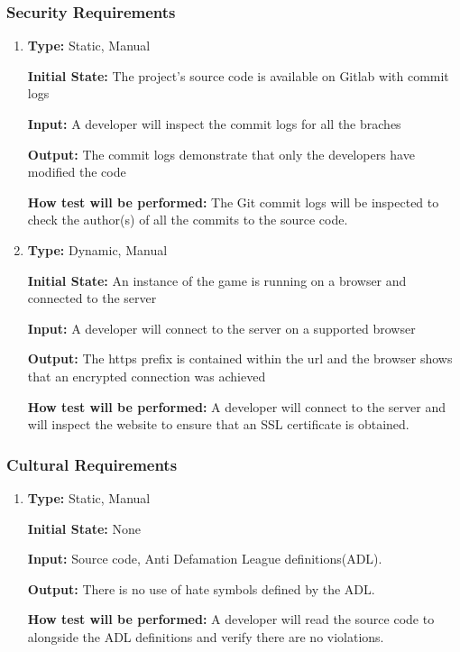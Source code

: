\documentclass[12pt, titlepage]{article}
\begin{document}
	\subsubsection{Security Requirements}
	\begin{enumerate}[{NFR-SR}1. ]
		
		\item
		\textbf{Type:} Static, Manual
		
		\textbf{Initial State:} The project's source code is available on Gitlab with commit logs
		
		\textbf{Input:} A developer will inspect the commit logs for all the braches
		
		\textbf{Output:} The commit logs demonstrate that only the developers have modified the code
		
		\textbf{How test will be performed:} The Git commit logs will be inspected to check the author(s) of all the commits to the source code.
		
		\item
		\textbf{Type:} Dynamic, Manual
		
		\textbf{Initial State:} An instance of the game is running on a browser and connected to the server
		
		\textbf{Input:} A developer will connect to the server on a supported browser
		
		\textbf{Output:} The https prefix is contained within the url and the browser shows that an encrypted connection was achieved
		
		\textbf{How test will be performed:} A developer will connect to the server and will inspect the website to ensure that an SSL certificate is obtained.
	\end{enumerate}
	\subsubsection{Cultural Requirements}
	\begin{enumerate}[{NFR-CR}1. ]
		\item
		\textbf{Type:} Static, Manual
		
		\textbf{Initial State:} None
		
		\textbf{Input:} Source code, Anti Defamation League definitions(ADL).
		
		\textbf{Output:} There is no use of hate symbols defined by the ADL.
		
		\textbf{How test will be performed:} A developer will read the source code to alongside the ADL definitions and verify there are no violations.
		
		
	\end{enumerate}
	
\end{document}
